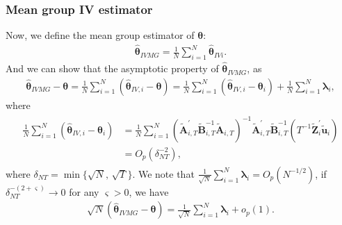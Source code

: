 \documentclass[12pt,a4paper,hyperref]{article}
\begin{document}
\subsubsection{Mean group IV estimator }
Now, we define the mean group estimator of $\boldsymbol{\theta}$:
\begin{align}
\hat{\boldsymbol{\theta}}_{IVMG}=\frac{1}{N}\sum^{N}_{i=1}\hat{\boldsymbol{\theta}}_{IVi}.
\end{align}
And we can show that the asymptotic property of $\hat{\boldsymbol{\theta}}_{IVMG}$, as
\begin{align}
\hat{\boldsymbol{\theta}}_{IVMG}-\boldsymbol{\theta}=\frac{1}{N}\sum^{N}_{i=1}\left(\hat{\boldsymbol{\theta}}_{IV,i}- \boldsymbol{\theta}\right)=\frac{1}{N}\sum^{N}_{i=1}\left(\hat{\boldsymbol{\theta}}_{IV,i}- \boldsymbol{\theta}_{i}\right)+\frac{1}{N}\sum^{N}_{i=1}\boldsymbol{\lambda}_{i},
\end{align}
where
\begin{align}
\begin{split}
\frac{1}{N}\sum^{N}_{i=1}\left(\hat{\boldsymbol{\theta}}_{IV,i}- \boldsymbol{\theta}_{i}\right)&=\frac{1}{N}\sum^{N}_{i=1} \left(\tilde{\boldsymbol{A}}_{i,T}^{'}\tilde{\boldsymbol{B}}_{i,T}^{-1}\tilde{\boldsymbol{A}}_{i,T} \right)^{-1}\tilde{\boldsymbol{A}}_{i,T}^{'}\tilde{\boldsymbol{B}}_{i,T}^{-1}\left(T^{-1}  \tilde{\boldsymbol{Z}}^{'}_{i}\tilde{\boldsymbol{u}}_{i} \right) \\
&= O_{p}\left(\delta^{-2}_{NT} \right),
\end{split}
\end{align}
where $\delta_{NT}=\min \{\sqrt{N},\,\sqrt{T} \}$.
We note that $\frac{1}{\sqrt{N}}\sum^{N}_{i=1}\boldsymbol{\lambda}_{i}=O_{p}\left(N^{-1/2} \right)$, if $\delta_{NT}^{-(2+\varsigma)}\to 0$ for any $\varsigma >0$, we have
\begin{align}
\sqrt{N}\left(\hat{\boldsymbol{\theta}}_{IVMG}-\boldsymbol{\theta}  \right)=\frac{1}{\sqrt{N}}\sum^{N}_{i=1}\boldsymbol{\lambda}_{i}+o_{p} \left(1 \right).
\end{align}
\end{document}
